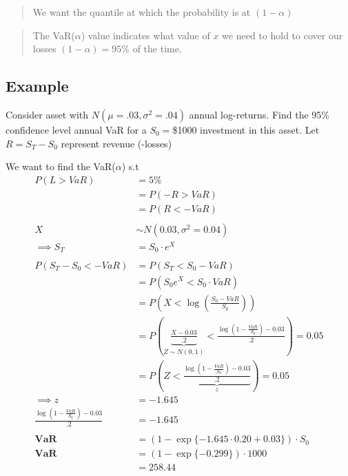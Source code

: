 \documentclass[
  oneside]{book}
\begin{document}
\begin{quote}
We want the quantile at which the probability is at \((1-\alpha)\)
\end{quote}

\begin{quote}
The VaR(\(\alpha\)) value indicates what value of \(x\) we need to hold to cover our losses \((1-\alpha) = 95\%\) of the time.
\end{quote}

\hypertarget{example-1}{%
\subsection{Example}\label{example-1}}

Consider asset with \(N(\mu=.03, \sigma^{2}=.04)\) annual log-returns. Find the 95\% confidence level annual VaR for a \(S_{0} =\)\$1000 investment in this asset. Let \(R=S_{T}-S_{0}\) represent revenue (-losses)

We want to find the VaR(\(\alpha\)) s.t
\[
\begin{aligned}
P(L > VaR) &= 5\%\\
&= P(-R > VaR) \\
&= P(R < -VaR)\\
\\
X &\sim N(0.03, \sigma^{2}=0.04)\\
\implies S_{T} &= S_{0}\cdot e^{X}\\
\\
P(S_{T}-S_{0} < -VaR) &= P(S_{T} < S_{0}-VaR)\\
&= P(S_{0}e^{X} < S_{0}\cdot VaR)\\
&= P\left( X < \log\left( \frac{S_{0}-VaR}{S_{0}} \right)\right)\\
&= P\left( \underbrace{ \frac{X-0.03}{.2} }_{ Z\sim N(0,1) } < \frac{\log\left( 1-\frac{VaR}{S_{0}} \right)-0.03}{.2} \right) = 0.05\\
&= P\left( Z < \underbrace{ \frac{\log\left( 1-\frac{VaR}{S_{0}} \right)-0.03}{.2} }_{ z } \right) = 0.05\\
\implies z &= -1.645\\
\frac{\log\left( 1-\frac{VaR}{S_{0}} \right)-0.03}{.2} &= -1.645\\
\\
\mathbf{VaR} &= (1-\exp\{-1.645\cdot 0.20+0.03\}) \cdot S_{0}\\
\mathbf{VaR} &= (1-\exp\{-0.299\})\cdot 1000\\
&= \mathbf{258.44}
\end{aligned}
\]
\end{document}
